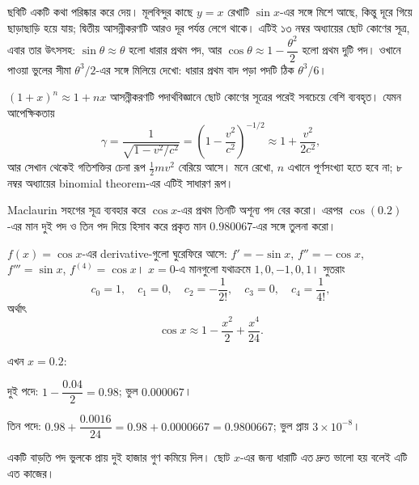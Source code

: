 \documentclass[11pt]{article}
\begin{document}
\begin{center}
\end{center}

ছবিটি একটি কথা পরিষ্কার করে দেয়। মূলবিন্দুর কাছে $y=x$ রেখাটি $\sin x$-এর
সঙ্গে মিশে আছে, কিন্তু দূরে গিয়ে ছাড়াছাড়ি হয়ে যায়; দ্বিতীয় আসন্নীকরণটি
আরও দূর পর্যন্ত লেগে থাকে। এটিই ১৩ নম্বর অধ্যায়ের ছোট কোণের সূত্র, এবার
তার উৎসসহ: $\sin\theta \approx \theta$ হলো ধারার প্রথম পদ, আর
$\cos\theta \approx 1 - \dfrac{\theta^{2}}{2}$ হলো প্রথম দুটি পদ। ওখানে
পাওয়া ভুলের সীমা $\theta^{3}/2$-এর সঙ্গে মিলিয়ে দেখো: ধারার প্রথম বাদ পড়া
পদটি ঠিক $\theta^{3}/6$।

\begin{remark}
$(1+x)^{n} \approx 1 + nx$ আসন্নীকরণটি পদার্থবিজ্ঞানে ছোট কোণের সূত্রের পরেই
সবচেয়ে বেশি ব্যবহৃত। যেমন আপেক্ষিকতায়
\[
  \gamma = \frac{1}{\sqrt{1 - v^{2}/c^{2}}}
  = \left( 1 - \frac{v^{2}}{c^{2}} \right)^{-1/2}
  \approx 1 + \frac{v^{2}}{2c^{2}} ,
\]
আর সেখান থেকেই গতিশক্তির চেনা রূপ $\tfrac{1}{2}mv^{2}$ বেরিয়ে আসে। মনে রেখো,
$n$ এখানে পূর্ণসংখ্যা হতে হবে না; ৮ নম্বর অধ্যায়ের binomial theorem-এর
এটিই সাধারণ রূপ।
\end{remark}

 Maclaurin সহগের সূত্র ব্যবহার করে $\cos x$-এর প্রথম তিনটি অশূন্য পদ
বের করো। এরপর $\cos(0.2)$-এর মান দুই পদ ও তিন পদ দিয়ে হিসাব করে প্রকৃত মান
$0.980067$-এর সঙ্গে তুলনা করো।

\begin{sol}
$f(x) = \cos x$-এর derivative-গুলো ঘুরেফিরে আসে:
$f' = -\sin x$, $f'' = -\cos x$, $f''' = \sin x$, $f^{(4)} = \cos x$।
$x=0$-এ মানগুলো যথাক্রমে $1, 0, -1, 0, 1$। সুতরাং
\[
  c_{0} = 1, \quad c_{1} = 0, \quad c_{2} = -\frac{1}{2!}, \quad
  c_{3} = 0, \quad c_{4} = \frac{1}{4!} ,
\]
অর্থাৎ
\[
  \cos x \approx 1 - \frac{x^{2}}{2} + \frac{x^{4}}{24} .
\]

এখন $x = 0.2$:

দুই পদে: $1 - \dfrac{0.04}{2} = 0.98$; ভুল $0.000067$।

তিন পদে: $0.98 + \dfrac{0.0016}{24} = 0.98 + 0.0000667 = 0.9800667$; ভুল
প্রায় $3 \times 10^{-8}$।

একটি বাড়তি পদ ভুলকে প্রায় দুই হাজার গুণ কমিয়ে দিল। ছোট $x$-এর জন্য ধারাটি
এত দ্রুত ভালো হয় বলেই এটি এত কাজের।
\end{sol}
\end{document}
